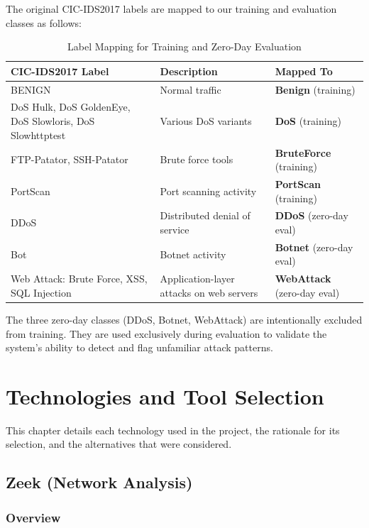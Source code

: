 \documentclass[12pt,a4paper,twoside]{report}
\begin{document}
The original CIC-IDS2017 labels are mapped to our training and evaluation classes as follows:

\begin{table}[H]
\centering
\caption{Label Mapping for Training and Zero-Day Evaluation}
\small
\begin{tabular}{l p{5.5cm} l}
\toprule
\textbf{CIC-IDS2017 Label} & \textbf{Description} & \textbf{Mapped To} \\
\midrule
BENIGN & Normal traffic & \textbf{Benign} (training) \\
DoS Hulk, DoS GoldenEye, DoS Slowloris, DoS Slowhttptest & Various DoS variants & \textbf{DoS} (training) \\
FTP-Patator, SSH-Patator & Brute force tools & \textbf{BruteForce} (training) \\
PortScan & Port scanning activity & \textbf{PortScan} (training) \\
DDoS & Distributed denial of service & \textbf{DDoS} (zero-day eval) \\
Bot & Botnet activity & \textbf{Botnet} (zero-day eval) \\
Web Attack: Brute Force, XSS, SQL Injection & Application-layer attacks on web servers & \textbf{WebAttack} (zero-day eval) \\
\bottomrule
\end{tabular}
\end{table}

The three zero-day classes (DDoS, Botnet, WebAttack) are intentionally excluded from training. They are used exclusively during evaluation to validate the system's ability to detect and flag unfamiliar attack patterns.

\chapter{Technologies and Tool Selection}

This chapter details each technology used in the project, the rationale for its selection, and the alternatives that were considered.

\section{Zeek (Network Analysis)}

\subsection{Overview}
\end{document}
